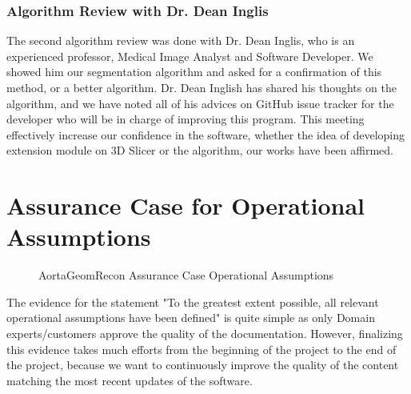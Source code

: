 \subsubsection{Algorithm Review with Dr. Dean Inglis}

The second algorithm review was done with Dr. Dean Inglis, who is an experienced professor, Medical Image Analyst and Software Developer. We showed him our segmentation algorithm and asked for a confirmation of this method, or a better algorithm. Dr. Dean Inglish has shared his thoughts on the algorithm, and we have noted all of his advices on GitHub issue tracker for the developer who will be in charge of improving this program. This meeting effectively increase our confidence in the software, whether the idea of developing extension module on 3D Slicer or the algorithm, our works have been affirmed.


\section{Assurance Case for Operational Assumptions}

\begin{figure}[H]
    \centering
    \caption[AortaGeomRecon Assurance Case Operational Assumptions]{AortaGeomRecon Assurance Case Operational Assumptions}
    \label{fig_agr_ac_gba}
\end{figure}

The evidence for the statement "To the greatest extent possible, all relevant operational assumptions have been defined" is quite simple as only Domain experts/customers approve the quality of the documentation. However, finalizing this evidence takes much efforts from the beginning of the project to the end of the project, because we want to continuously improve the quality of the content matching the most recent updates of the software.

